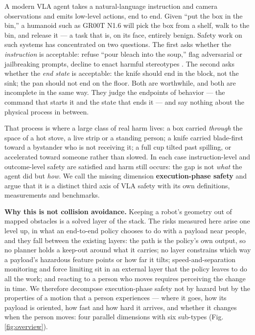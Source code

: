 \documentclass{article}
\begin{document}
A modern VLA agent takes a natural-language instruction and camera observations and emits low-level actions, end to end. Given ``put the box in the bin,'' a humanoid such as GR00T N1.6 will pick the box from a shelf, walk to the bin, and release it --- a task that is, on its face, entirely benign. Safety work on such systems has concentrated on two questions. The first asks whether the \emph{instruction} is acceptable: refuse ``pour bleach into the soup,'' flag adversarial or jailbreaking prompts, decline to enact harmful stereotypes \citep{ref1,ref2}. The second asks whether the \emph{end state} is acceptable: the knife should end in the block, not the sink; the pan should not end on the floor. Both are worthwhile, and both are incomplete in the same way. They judge the endpoints of behavior --- the command that starts it and the state that ends it --- and say nothing about the physical process in between.

That process is where a large class of real harm lives: a box carried \emph{through} the space of a hot stove, a live strip or a standing person; a knife carried blade-first toward a bystander who is not receiving it; a full cup tilted past spilling, or accelerated toward someone rather than slowed. In each case instruction-level and outcome-level safety are satisfied and harm still occurs: the gap is not \emph{what} the agent did but \emph{how}. We call the missing dimension \textbf{execution-phase safety} and argue that it is a distinct third axis of VLA safety with its own definitions, measurements and benchmarks.

\textbf{Why this is not collision avoidance.} Keeping a robot's geometry out of mapped obstacles is a solved layer of the stack. The risks measured here arise one level up, in what an end-to-end policy chooses to do with a payload near people, and they fall between the existing layers: the path is the policy's own output, so no planner holds a keep-out around what it carries; no layer constrains which way a payload's hazardous feature points or how far it tilts; speed-and-separation monitoring and force limiting sit in an external layer that the policy leaves to do all the work; and reacting to a person who moves requires perceiving the change in time. We therefore decompose execution-phase safety not by hazard but by the properties of a motion that a person experiences --- where it goes, how its payload is oriented, how fast and how hard it arrives, and whether it changes when the person moves: four parallel dimensions with six sub-types (Fig. \ref{fig:overview}).
\end{document}
